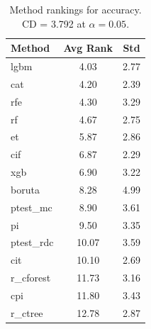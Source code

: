 \begin{table}[h]
\centering
\caption{Method rankings for accuracy. CD = 3.792 at $\alpha=0.05$.}
\label{tab:ranks_accuracy}
\begin{tabular}{lcc}
\toprule
Method & Avg Rank & Std \\
\midrule
lgbm & 4.03 & 2.77 \\
cat & 4.20 & 2.39 \\
rfe & 4.30 & 3.29 \\
rf & 4.67 & 2.75 \\
et & 5.87 & 2.86 \\
cif & 6.87 & 2.29 \\
xgb & 6.90 & 3.22 \\
boruta & 8.28 & 4.99 \\
ptest_mc & 8.90 & 3.61 \\
pi & 9.50 & 3.35 \\
ptest_rdc & 10.07 & 3.59 \\
cit & 10.10 & 2.69 \\
r_cforest & 11.73 & 3.16 \\
cpi & 11.80 & 3.43 \\
r_ctree & 12.78 & 2.87 \\
\bottomrule
\end{tabular}
\end{table}